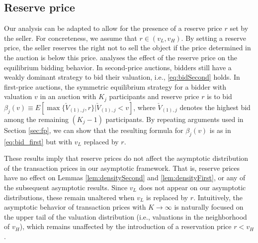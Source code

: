 \subsection{Reserve price}

Our analysis can be adapted to allow for the presence of a reserve price $r$ set by the seller. For concreteness, we assume that  $r\in (v_{L},v_{H}) $. By setting a reserve price, the seller reserves the right not to sell the object if the price determined in the auction is below this price. \citet[Section 2.5]{krishna2009book} analyses the effect of the reserve price on the equilibrium bidding behavior. In second-price auctions, bidders still have a weakly dominant strategy to bid their valuation, i.e., \eqref{eq:bidSecond} holds. In first-price auctions, the symmetric equilibrium strategy for a bidder with valuation $v$ in an auction with $K_{j}$ participants and reserve price $r$ is to bid $\beta _{j}(v)\equiv E[\max \{\check{V}_{(1),j},r\}|\check{V}_{(1),j}<v]$, where $\check{V}_{(1),j}$ denotes the highest bid among the remaining $(K_{j}-1)$ participants.
By repeating arguments used in Section \ref{sec:fp}, we can show that the resulting formula for $\beta _{j}(v)$ is as in \eqref{eq:bid_first} but with $v_{L}$ replaced by $r$. 

These results imply that reserve prices do not affect the asymptotic distribution of the transaction prices in our asymptotic framework. That is, reserve prices have no effect on Lemmas \ref{lem:densitySecond} and \ref{lem:densityFirst}, or any of the subsequent asymptotic results. Since $v_{L}$ does not appear on our asymptotic distributions, these remain unaltered when $v_{L}$ is replaced by $r$. Intuitively, the asymptotic behavior of transaction prices with $K\rightarrow \infty $ is naturally focused on the upper tail of the valuation distribution (i.e., valuations in the neighborhood of $v_{H}$), which remains unaffected by the introduction of a reservation price $r<v_{H}$.

